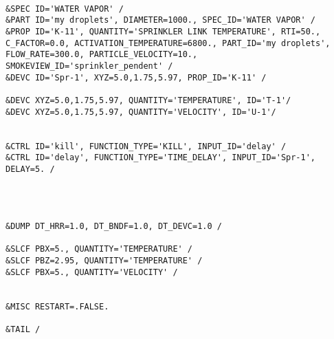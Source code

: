 \begin{lstlisting}[emptylines=0,basicstyle=\tiny]
 
&SPEC ID='WATER VAPOR' /
&PART ID='my droplets', DIAMETER=1000., SPEC_ID='WATER VAPOR' /
&PROP ID='K-11', QUANTITY='SPRINKLER LINK TEMPERATURE', RTI=50., C_FACTOR=0.0, ACTIVATION_TEMPERATURE=6800., PART_ID='my droplets', FLOW_RATE=300.0, PARTICLE_VELOCITY=10., SMOKEVIEW_ID='sprinkler_pendent' /
&DEVC ID='Spr-1', XYZ=5.0,1.75,5.97, PROP_ID='K-11' /

&DEVC XYZ=5.0,1.75,5.97, QUANTITY='TEMPERATURE', ID='T-1'/
&DEVC XYZ=5.0,1.75,5.97, QUANTITY='VELOCITY', ID='U-1'/


&CTRL ID='kill', FUNCTION_TYPE='KILL', INPUT_ID='delay' /
&CTRL ID='delay', FUNCTION_TYPE='TIME_DELAY', INPUT_ID='Spr-1', DELAY=5. /




&DUMP DT_HRR=1.0, DT_BNDF=1.0, DT_DEVC=1.0 /

&SLCF PBX=5., QUANTITY='TEMPERATURE' /
&SLCF PBZ=2.95, QUANTITY='TEMPERATURE' /
&SLCF PBX=5., QUANTITY='VELOCITY' /


&MISC RESTART=.FALSE.

&TAIL /
\end{lstlisting}

